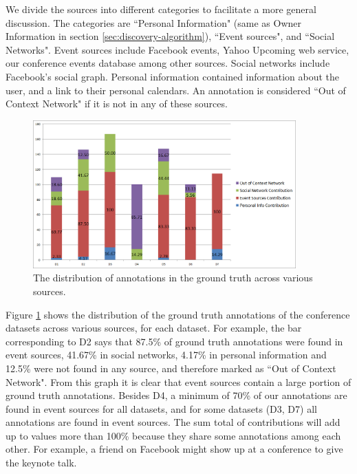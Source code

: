 We divide the sources into different categories to facilitate a more general discussion. The categories are ``Personal Information" (same as Owner Information in section \ref{sec:discovery-algorithm}), ``Event sources", and ``Social Networks". Event sources include Facebook events, Yahoo Upcoming web service, our conference events database among other sources. Social networks include Facebook's social graph. Personal information contained information about the user, and a link to their personal calendars. An annotation is considered ``Out of Context Network" if it is not in any of these sources.

\begin{figure}[t]
\centering
\includegraphics[width=0.9\textwidth]{media/gt-distro-stacked-2.png}
\caption{The distribution of annotations in the ground truth across various sources.}
\label{fig:src-cand-distribution}
\end{figure}

Figure \ref{fig:src-cand-distribution} shows the distribution of the ground truth annotations of the conference datasets across various sources, for each dataset. For example, the bar corresponding to D2 says that 87.5\% of ground truth annotations were found in event sources, 41.67\% in social networks, 4.17\% in personal information and 12.5\% were not found in any source, and therefore marked as ``Out of Context Network". From this graph it is clear that event sources contain a large portion of ground truth annotations. Besides D4, a minimum of 70\% of our annotations are found in event sources for all datasets, and for some datasets (D3, D7) all annotations are found in event sources. The sum total of contributions will add up to values more than 100\% because they share some annotations among each other. For example, a friend on Facebook might show up at a conference to give the keynote talk.

